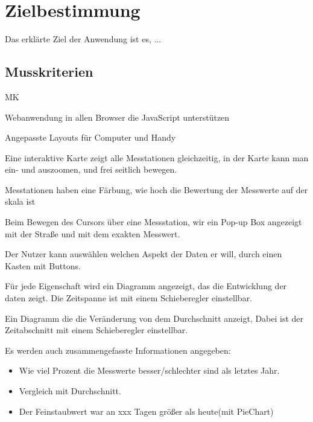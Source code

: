\section{Zielbestimmung}
Das erklärte Ziel der Anwendung ist es, ...

\subsection{Musskriterien}
\setcounter{counter}{10}

\begin{Kriterien}{MK}

	\item Webanwendung in allen Browser die JavaScript unterstützen

	\item Angepasste Layouts für Computer und Handy
	
	\item Eine interaktive Karte zeigt alle Messtationen gleichzeitig, in der Karte kann man ein- und auszoomen, und frei seitlich bewegen.

	\item Messtationen haben eine Färbung, wie hoch die Bewertung der Messwerte auf der skala ist
	
	\item Beim Bewegen des Cursors über eine Messstation, wir ein Pop-up Box angezeigt mit der Straße und mit dem exakten Messwert.
	
	\item Der Nutzer kann auswählen welchen Aspekt der Daten er will, durch einen Kasten mit Buttons. 
	
	\item Für jede Eigenschaft wird ein Diagramm angezeigt, das die Entwicklung der daten zeigt. Die Zeitspanne ist mit einem Schieberegler einstellbar.
	
	\item Ein Diagramm die die Veränderung von dem Durchschnitt anzeigt, Dabei ist der Zeitabschnitt mit einem Schieberegler einstellbar.
	
	\item Es werden auch zusammengefasste Informationen angegeben: 
\end{Kriterien}
		
\begin{itemize}
	\item Wie viel Prozent die Messwerte besser/schlechter sind als letztes Jahr.
    \item Vergleich mit Durchschnitt.
    \item Der Feinstaubwert war an xxx Tagen größer als heute(mit PieChart)
\end{itemize}

